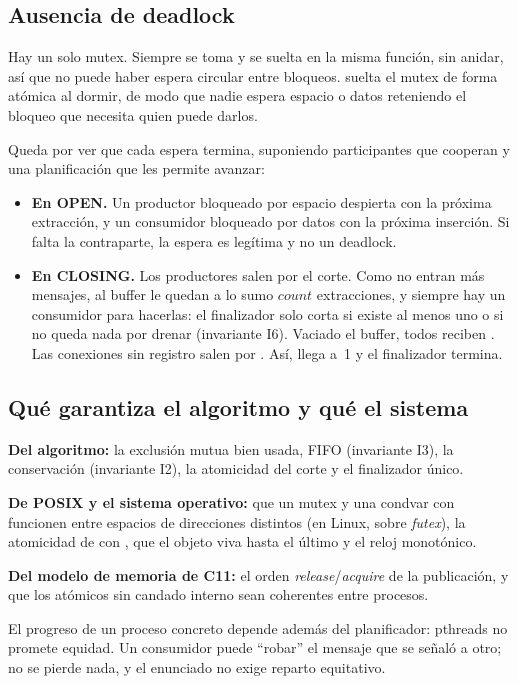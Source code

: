 \subsection{Ausencia de deadlock}

Hay un solo mutex. Siempre se toma y se suelta en la misma función, sin
anidar, así que no puede haber espera circular entre bloqueos.
 suelta el mutex de forma atómica al dormir, de
modo que nadie espera espacio o datos reteniendo el bloqueo que necesita
quien puede darlos.

Queda por ver que cada espera termina, suponiendo participantes que
cooperan y una planificación que les permite avanzar:
\begin{itemize}
  \item \textbf{En OPEN.} Un productor bloqueado por espacio despierta con
  la próxima extracción, y un consumidor bloqueado por datos con la
  próxima inserción. Si falta la contraparte, la espera es legítima y no
  un deadlock.
  \item \textbf{En CLOSING.} Los productores salen por el corte. Como no
  entran más mensajes, al buffer le quedan a lo sumo $\mathit{count}$
  extracciones, y siempre hay un consumidor para hacerlas: el finalizador
  solo corta si existe al menos uno o si no queda nada por drenar
  (invariante I6). Vaciado el buffer, todos reciben . Las conexiones sin
  registro salen por . Así,  llega a~1 y
  el finalizador termina.
\end{itemize}

\subsection{Qué garantiza el algoritmo y qué el sistema}

\textbf{Del algoritmo:} la exclusión mutua bien usada, FIFO (invariante I3),
la conservación (invariante I2), la atomicidad del corte y el finalizador único.

\textbf{De POSIX y el sistema operativo:} que un mutex y una condvar con
 funcionen entre espacios de direcciones
distintos (en Linux, sobre \emph{futex}), la atomicidad de 
con , que el objeto viva hasta el último  y el
reloj monotónico.

\textbf{Del modelo de memoria de C11:} el orden \emph{release}/\emph{acquire}
de la publicación, y que los atómicos sin candado interno sean coherentes
entre procesos.

El progreso de un proceso concreto depende además del planificador:
pthreads no promete equidad. Un consumidor puede ``robar'' el mensaje que
se señaló a otro; no se pierde nada, y el enunciado no exige reparto
equitativo.
